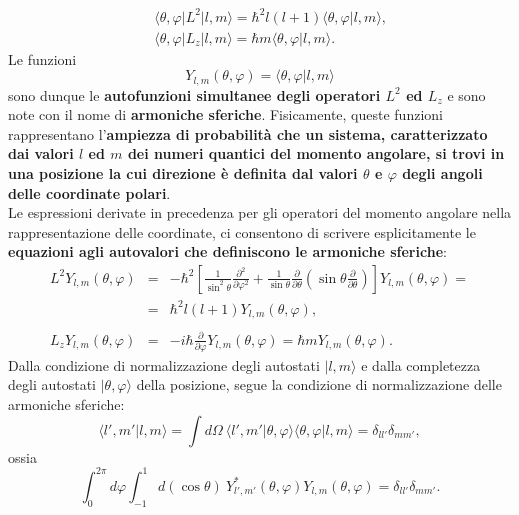 \begin{eqnarray}
& &\langle \theta , \varphi \vert L^2 \vert l, m \rangle = \hbar ^2 l(l+1) \langle \theta , \varphi \vert l, m \rangle ,\\
& &\langle \theta , \varphi \vert L_z \vert l, m \rangle = \hbar m\langle \theta , \varphi \vert l, m \rangle .
\end{eqnarray}
Le funzioni
\begin{equation}
Y_{l,m} (\theta, \varphi )= \langle \theta , \varphi \vert l, m \rangle 
\end{equation}
sono dunque le \textbf{autofunzioni simultanee degli operatori $L^2$ ed $L_z$} e sono note con il nome di \textbf{armoniche sferiche}. Fisicamente, queste funzioni rappresentano l'\textbf{ampiezza di probabilità che un sistema, caratterizzato dai valori $l$ ed $m$ dei numeri quantici del momento angolare, si trovi in una posizione la cui direzione è definita dal valori $\theta$ e $\varphi$ degli angoli delle coordinate polari}.\\
Le espressioni derivate in precedenza per gli operatori del momento angolare nella rappresentazione delle coordinate, ci consentono di scrivere esplicitamente le \textbf{equazioni agli autovalori che definiscono le armoniche sferiche}:
\begin{eqnarray}
L^2 Y_{l,m} (\theta, \varphi) &=&-\hbar ^2 \left[\frac{1}{\sin ^2 \theta}\frac{\partial ^2}{\partial \varphi ^2}+\frac{1}{\sin \theta}\frac{\partial}{\partial \theta} \left(\sin \theta \frac{\partial}{\partial \theta}\right)\right]Y_{l,m}(\theta, \varphi) = \nonumber \\
&=& \hbar ^2 l(l+1)Y_{l,m}(\theta, \varphi) ,\label{eq:cap17_8}\\
& &\nonumber \\
L_zY_{l,m}(\theta, \varphi)&=& -i\hbar \frac{\partial}{\partial \varphi}Y_{l,m}(\theta, \varphi)= \hbar m Y_{l,m}(\theta, \varphi) \label{eq:cap17_9}.
\end{eqnarray}
Dalla condizione di normalizzazione degli autostati $\vert l,m \rangle$ e dalla completezza degli autostati $\vert \theta , \varphi\rangle $ della posizione, segue la condizione di normalizzazione delle armoniche sferiche:
\begin{equation}
\langle l' , m' \vert l,m \rangle = \int d\Omega \ \langle l' ,m'\vert \theta, \varphi \rangle \langle \theta , \varphi \vert l, m \rangle = \delta _{ll'} \delta _{mm'} ,
\end{equation}
ossia
\begin{equation}
\int _0 ^{2\pi} d\varphi \int _{-1} ^1 d(\cos \theta )\ Y_{l',m'}^* (\theta , \varphi ) Y_{l,m} (\theta, \varphi )=\delta _{ll'} \delta _{mm'}.
\end{equation}
